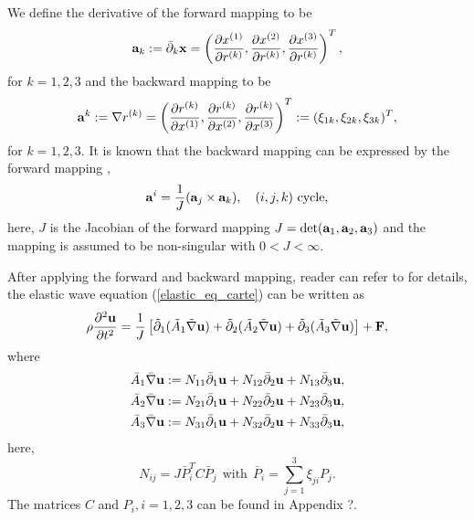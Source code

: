\documentclass[a4paper]{article}
\begin{document}
We define the derivative of the forward mapping to be 
\begin{equation}\label{elastic_eq_carte}
{\bf a}_k := \bar{\partial}_k{\bf x} = \left(\frac{\partial x^{(1)}}{\partial r^{(k)}},\frac{\partial x^{(2)}}{\partial r^{(k)}},\frac{\partial x^{(3)}}{\partial r^{(k)}}\right)^T,
\end{equation}
for $k = 1,2,3$ and the backward mapping to be
\begin{equation*}
{\bf a}^k := \nabla r^{(k)} = \left(\frac{\partial r^{(k)}}{\partial x^{(1)}},\frac{\partial r^{(k)}}{\partial x^{(2)}},\frac{\partial r^{(k)}}{\partial x^{(3)}}\right)^T := (\xi_{1k},\xi_{2k},\xi_{3k})^T,
\end{equation*}
for $k = 1,2,3$. It is known that the backward mapping can be expressed by the forward mapping \cite{?}, 
\begin{equation*}
{\bf a}^i = \frac{1}{J}({\bf a}_j\times{\bf a}_k), \ \ \ (i,j,k) \ \text{cycle},
\end{equation*}
here, $J$ is the Jacobian of the forward mapping $J = \text{det}({\bf a}_1, {\bf a}_2, {\bf a}_3)$ and the mapping is assumed to be non-singular with $0<J<\infty$.

After applying the forward and backward mapping, reader can refer to \cite{?} for details, the elastic wave equation (\ref{elastic_eq_carte}) can be written as
\begin{equation}\label{elastic_eq_curvi}
\rho\frac{\partial^2 {\bf u}}{\partial t^2} = \frac{1}{J}\left[\tilde{\partial }_1(\tilde{A}_1\tilde{\nabla}{\bf u}) + \tilde{\partial }_2(\tilde{A}_2\tilde{\nabla}{\bf u}) +\tilde{\partial }_3(\tilde{A}_3\tilde{\nabla}{\bf u}) \right] + {\bf F},
\end{equation}
where
\begin{align*}
	\bar{A}_1\bar{\nabla}{\bf u} &:= N_{11}\bar{\partial}_1{\bf u} + N_{12}\bar{\partial}_2{\bf u} + N_{13}\bar{\partial}_3{\bf u}, \\
	\bar{A}_2\bar{\nabla}{\bf u} &:= N_{21}\bar{\partial}_1{\bf u} + N_{22}\bar{\partial}_2{\bf u} + N_{23}\bar{\partial}_3{\bf u}, \\
	\bar{A}_3\bar{\nabla}{\bf u} &:= N_{31}\bar{\partial}_1{\bf u} + N_{32}\bar{\partial}_2{\bf u} + N_{33}\bar{\partial}_3{\bf u},
\end{align*}
here, 
\begin{equation}\label{definition_Nij}
N_{ij} = J\bar{P}_i^TC\bar{P}_j \ \ \text{with} \ \ \bar{P}_i = \sum_{j=1}^3\xi_{ji}P_j.
\end{equation}
The matrices $C$ and $P_i, i = 1,2,3$ can be found in Appendix ?. 
\end{document}
